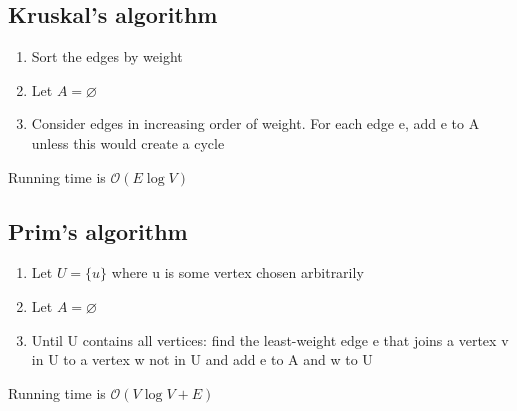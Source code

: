 \documentclass{article}[18pt]
\begin{document}
\subsection{Kruskal's algorithm}
\begin{enumerate}
	\item Sort the edges by weight
	\item Let $A=\varnothing$
	\item Consider edges in increasing order of weight. For each edge e, add e to A unless this would create a cycle
\end{enumerate}
Running time is $\mathcal{O}(E\log V)$
\subsection{Prim's algorithm}
\begin{enumerate}
	\item Let $U=\{u\}$ where u is some vertex chosen arbitrarily
	\item Let $A=\varnothing$
	\item Until U contains all vertices: find the least-weight edge e that joins a vertex v in U to a vertex w not in U and add e to A and w to U
\end{enumerate}
Running time is $\mathcal{O}(V\log V+E)$
\end{document}
